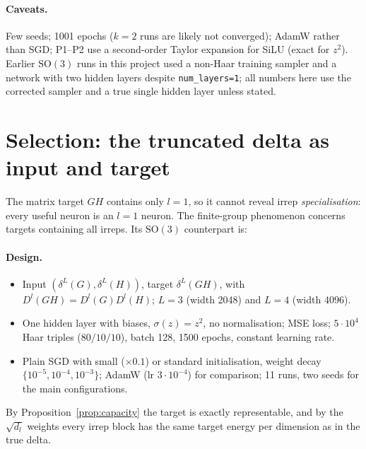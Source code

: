 \documentclass[a4paper,11pt]{article}
\theoremstyle{remark}
\theoremstyle{definition}
\newcommand{\SO}{\mathrm{SO}(3)}
\begin{document}
\paragraph{Caveats.} Few seeds; 1001 epochs ($k=2$ runs are likely not
converged); AdamW rather than SGD; P1--P2 use a second-order Taylor expansion
for SiLU (exact for $z^2$).
Earlier $\SO$ runs in this project used a non-Haar training sampler and a
network with two hidden layers despite \texttt{num\_layers=1}; all numbers here
use the corrected sampler and a true single hidden layer unless stated.

\section{Selection: the truncated delta as input and target}
\label{sec:planned}

The matrix target $GH$ contains only $l=1$, so it cannot reveal irrep
\emph{specialisation}: every useful neuron is an $l=1$ neuron. The finite-group
phenomenon concerns targets containing all irreps. Its $\SO$ counterpart is:

\paragraph{Design.}
\begin{itemize}
\item Input $(\delta^L(G),\delta^L(H))$, target $\delta^L(GH)$, with
  $D^l(GH)=D^l(G)D^l(H)$; $L=3$ (width 2048) and $L=4$ (width 4096).
\item One hidden layer with biases, $\sigma(z)=z^2$, no normalisation; MSE loss;
  $5\cdot10^4$ Haar triples ($80/10/10$), batch 128, 1500 epochs, constant
  learning rate.
\item Plain SGD with small ($\times0.1$) or standard initialisation, weight decay
  $\{10^{-5},10^{-4},10^{-3}\}$; AdamW (lr $3\cdot10^{-4}$) for comparison;
  11 runs, two seeds for the main configurations.
\end{itemize}
By Proposition~\ref{prop:capacity} the target is exactly representable, and by
the $\sqrt{d_l}$ weights every irrep block has the same target energy per
dimension as in the true delta.
\end{document}
